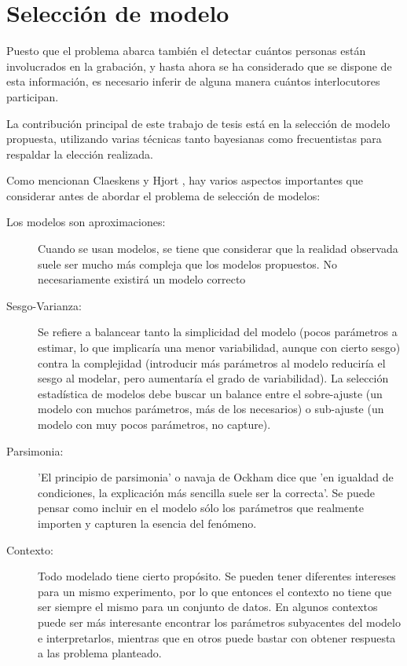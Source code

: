 
\chapter{Selección de modelo}


Puesto que el problema abarca también el detectar cuántos personas están involucrados en la grabación, y hasta ahora se ha considerado que se dispone de esta información, es necesario inferir de alguna manera cuántos interlocutores participan.

La contribución principal de este trabajo de tesis está en la selección de modelo propuesta, utilizando varias técnicas tanto bayesianas como frecuentistas para respaldar la elección realizada.

Como mencionan Claeskens y Hjort \cite{Claeskens2010}, hay varios aspectos importantes que considerar antes de abordar el problema de selección de modelos: 

\begin{description}
\item[Los modelos son aproximaciones:] Cuando se usan modelos, se tiene que considerar que la realidad observada suele ser mucho más compleja que los modelos propuestos. No necesariamente existirá un modelo correcto 

\item[Sesgo-Varianza:] Se refiere a balancear tanto la simplicidad del modelo (pocos parámetros a estimar, lo que implicaría una menor variabilidad, aunque con cierto sesgo) contra la complejidad (introducir más parámetros al modelo reduciría el sesgo al modelar, pero aumentaría el grado de variabilidad). La selección estadística de modelos debe buscar un balance entre el sobre-ajuste (un modelo con muchos parámetros, más de los necesarios) o sub-ajuste (un modelo con muy pocos parámetros, no capture).

\item[Parsimonia:] 'El principio de parsimonia' o navaja de Ockham dice que 'en igualdad de condiciones, la explicación más sencilla suele ser la correcta'. Se puede pensar como incluir en el modelo sólo los parámetros que realmente importen y capturen la esencia del fenómeno. 

\item[Contexto:] Todo modelado tiene cierto propósito. Se pueden tener diferentes intereses para un mismo experimento, por lo que entonces el contexto no tiene que ser siempre el mismo para un conjunto de datos. En algunos contextos puede ser más interesante encontrar los parámetros subyacentes del modelo e interpretarlos, mientras que en otros puede bastar con obtener respuesta a las problema planteado.

\end{description}

